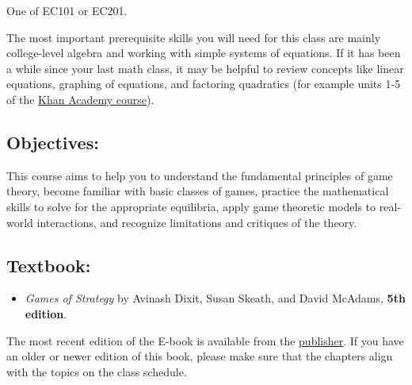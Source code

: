 One of EC101 or EC201.

The most important prerequisite skills you will need for this class are mainly college-level algebra
and working with simple systems of equations.
If it has been a while since your last math class, 
it may be helpful to review concepts like linear equations, graphing of equations, and factoring quadratics
(for example units 1-5 of the \href{https://www.khanacademy.org/math/college-algebra}{Khan Academy course}).

\subsection{Objectives:}

This course aims to help you to understand the fundamental principles of game theory, become familiar with basic classes of games, practice the mathematical skills to solve for the appropriate equilibria, apply game theoretic models to real-world interactions, and recognize limitations and critiques of the theory.

\subsection{Textbook:}

\begin{itemize}
  \item 
\textit{Games of Strategy} by Avinash Dixit, Susan Skeath, and David McAdams, \textbf{5th edition}.
\end{itemize}
  The most recent edition of the E-book is available from the \href{https://wwnorton.com/books/Games-of-Strategy}{publisher}.
  If you have an older or newer edition of this book, please make sure that the chapters align with the topics on the class schedule.

  


